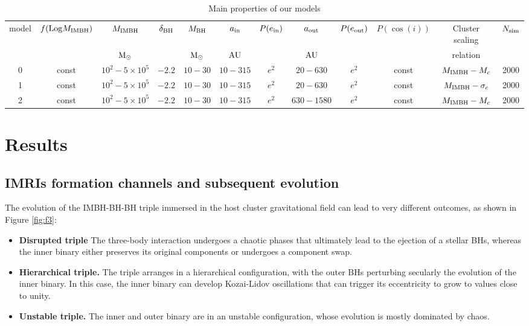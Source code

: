 \documentclass[useAMS,usenatbib]{mn2e}
\newcommand{\Log}{{\rm Log}}
\newcommand{\Ms}{{\rm M}_\odot}
\newcommand{\au}{{\rm AU}}
\newcommand{\ibh}{{\rm IMBH}}
\newcommand{\inn}{{\rm in}}
\newcommand{\out}{{\rm out}}
\newcommand{\bh}{{\rm BH}}
\begin{document}
\begin{table}
\begin{center}
\caption{Main properties of our models}
\begin{tabular}{cccccccccccc}
\hline
model   & $f(\Log M_\ibh)$ & $M_\ibh$ & $\delta_\bh$ & $M_\bh$ & $a_\inn$ & $P(e_\inn)$ & $a_\out$ & $P(e_\out)$ &$P(\cos(i))$ &Cluster scaling & $N_{\rm sim}$\\ 
        &             & $\Ms$    &            & $\Ms$   & $\au$    &          & $\au$    &         &  &relation &\\
\hline 
0 & const & $10^2-5\times 10^5$ & $-2.2$ & $10-30$ & $10-315$ & $e^2$ & $20-630$ & $e^2$ & const&$M_\ibh -M_c$ & 2000\\
1 & const & $10^2-5\times 10^5$ & $-2.2$ & $10-30$ & $10-315$ & $e^2$ & $20-630$ & $e^2$ & const&$M_\ibh -\sigma_c$ & 2000\\
2 & const & $10^2-5\times 10^5$ & $-2.2$ & $10-30$ & $10-315$ & $e^2$ & $630-1580$ & $e^2$ &const &$M_\ibh -M_c$ & 2000\\
\hline
\end{tabular}
\end{center}
\label{tab:t2}
\end{table}



\section{Results}
\label{res}


\subsection{IMRIs formation channels and subsequent evolution}

The evolution of the IMBH-BH-BH triple immersed in the host cluster gravitational field can lead to very different outcomes, as shown in Figure \ref{fig:f3}:
\begin{itemize}
    \item {\bf Disrupted triple} The three-body interaction undergoes a chaotic phases that ultimately lead to the ejection of a stellar BHs, whereas the inner binary either preserves its original components or undergoes a component swap.
    \item {\bf Hierarchical triple.} The triple arranges in a hierarchical configuration, with the outer BHs perturbing secularly the evolution of the inner binary. In this case, the inner binary can develop Kozai-Lidov oscillations \citep{kozai62,lidov62} that can trigger its eccentricity to grow to values close to unity. 
    \item {\bf Unstable triple.} The inner and outer binary are in an unstable configuration, whose evolution is mostly dominated by chaos.
\end{itemize}
\end{document}
